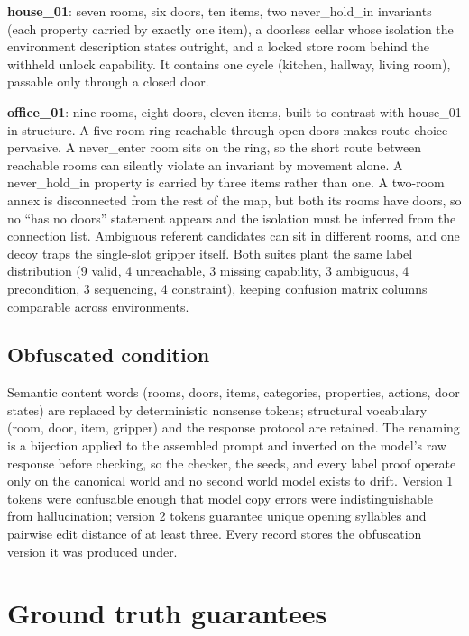 \documentclass[10pt]{article}
\begin{document}
\textbf{house\_01}: seven rooms, six doors, ten items, two
never\_hold\_in invariants (each property carried by exactly one item),
a doorless cellar whose isolation the environment description states
outright, and a locked store room behind the withheld unlock capability.
It contains one cycle (kitchen, hallway, living room), passable only
through a closed door.

\textbf{office\_01}: nine rooms, eight doors, eleven items, built to
contrast with house\_01 in structure. A
five-room ring reachable through open doors makes route choice pervasive.
A never\_enter room sits on the ring, so the short route between
reachable rooms can silently violate an invariant by movement alone. A
never\_hold\_in property is carried by three items rather than one. A
two-room annex is disconnected from the rest of the map, but both its
rooms have doors, so no ``has no doors'' statement appears and the
isolation must be inferred from the connection list. Ambiguous referent
candidates can sit in different rooms, and one decoy traps the
single-slot gripper itself. Both suites plant the same label
distribution (9 valid, 4 unreachable, 3 missing capability, 3 ambiguous,
4 precondition, 3 sequencing, 4 constraint), keeping confusion matrix
columns comparable across environments.

\subsection{Obfuscated condition}

Semantic content words (rooms, doors, items, categories, properties,
actions, door states) are replaced by deterministic nonsense tokens;
structural vocabulary (room, door, item, gripper) and the response
protocol are retained. The renaming is a bijection applied to the
assembled prompt and inverted on the model's raw response before
checking, so the checker, the seeds, and every label proof operate only
on the canonical world and no second world model exists to drift.
Version 1 tokens were confusable enough that model copy errors were
indistinguishable from hallucination; version 2 tokens guarantee unique
opening syllables and pairwise edit distance of at least three. Every
record stores the obfuscation version it was produced under.

\section{Ground truth guarantees}
\end{document}

